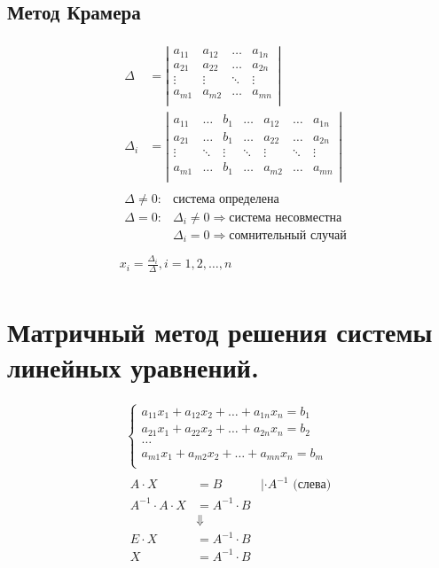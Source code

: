 \documentclass[12pt, fleqn]{article}
\begin{document}
\subsection*{Метод Крамера}
\begin{align*}
	&\begin{aligned}
	\Delta &= \left|\begin{matrix}
		a_{11}&a_{12}&\ldots&a_{1n}\\
		a_{21}&a_{22}&\ldots&a_{2n}\\
		\vdots&\vdots&\ddots&\vdots\\
		a_{m1}&a_{m2}&\ldots&a_{mn}\\
	\end{matrix}\right|\\
	\Delta_i &= \left|\begin{matrix}
		a_{11}&\ldots&b_{1}&\ldots& a_{12}&\ldots&a_{1n}\\
		a_{21}&\ldots&b_{1}&\ldots& a_{22}&\ldots&a_{2n}\\
		\vdots&\ddots&\vdots&\ddots&\vdots&\ddots&\vdots\\
		a_{m1}&\ldots&b_{1}&\ldots& a_{m2}&\ldots&a_{mn}\\
	\end{matrix}\right|
	\end{aligned}\\
	&\begin{aligned}
		\Delta\neq0\colon& \text{система определена}\\
		\Delta=0\colon & \Delta_i\neq0 \Rightarrow\text{система несовместна}\\
		&\Delta_i=0 \Rightarrow\text{сомнительный случай}\\
	\end{aligned}\\
	&x_i=\frac{\Delta_i}{\Delta}, i = 1,2,\dots,n\\
\end{align*}
\section{Матричный метод решения системы линейных уравнений.}
\begin{multline*}
	\begin{cases}
		a_{11}x_1+a_{12}x_2+\dots+a_{1n}x_n=b_1\\
		a_{21}x_1+a_{22}x_2+\dots+a_{2n}x_n=b_2\\
		\dots\\
		a_{m1}x_1+a_{m2}x_2+\dots+a_{mn}x_n=b_m\\
	\end{cases}\\
	\begin{aligned}
		A\cdot X &= B &|\cdot A^{-1} \text{ (слева)}\\
		A^{-1}\cdot A\cdot X&= A^{-1}\cdot B\\
		&\Downarrow\\
		E\cdot X &= A^{-1}\cdot B\\
		X &= A^{-1}\cdot B\\
	\end{aligned}\\	
\end{multline*}
\end{document}
